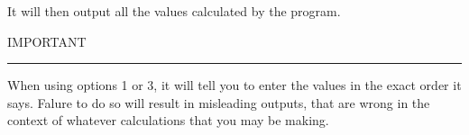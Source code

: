 \documentclass[]{article}
\begin{document}
It will then output all the values calculated by the program.
\begin{center}
IMPORTANT
\end{center}

\begin{center}\rule{0.5\linewidth}{\linethickness}\end{center}

When using options 1 or 3, it will tell you to enter the values in the
exact order it says. Falure to do so will result in misleading outputs,
that are wrong in the context of whatever calculations that you may be
making.
\end{document}
